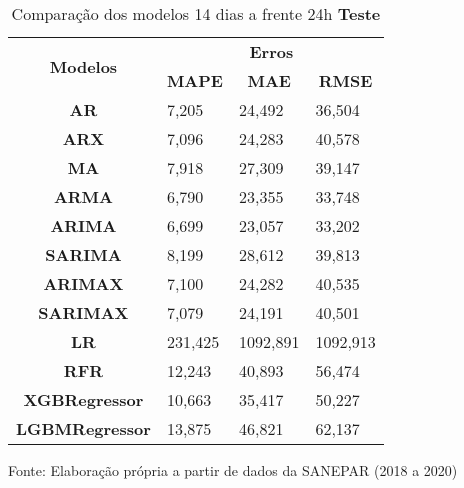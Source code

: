 \begin{table}[H]
	\centering
	\caption{Comparação dos modelos 14 dias a frente 24h \textbf{Teste} }\label{tb:30-24tst}
	\begin{tabular}{@{}clll@{}}
		\toprule
		\multirow{2}{*}{\textbf{Modelos}} & \multicolumn{3}{c}{\textbf{Erros}}                                                                       \\ \cmidrule(l){2-4} 
		& \multicolumn{1}{c}{\textbf{MAPE}} & \multicolumn{1}{c}{\textbf{MAE}} & \multicolumn{1}{c}{\textbf{RMSE}} \\ \hline
\textbf{AR}                       & 7,205                             & 24,492                           & 36,504                            \\
\textbf{ARX}                      & 7,096                             & 24,283                           & 40,578                            \\
\textbf{MA}                       & 7,918                             & 27,309                           & 39,147                            \\
\textbf{ARMA}                     & 6,790                             & 23,355                           & 33,748                            \\
\textbf{ARIMA}                    & 6,699                             & 23,057                           & 33,202                            \\
\textbf{SARIMA}                   & 8,199                             & 28,612                           & 39,813                            \\
\textbf{ARIMAX}                   & 7,100                             & 24,282                           & 40,535                            \\
\textbf{SARIMAX}                  & 7,079                             & 24,191                           & 40,501                            \\
\textbf{LR}        & 231,425                           & 1092,891                         & 1092,913                          \\
\textbf{RFR}  & 12,243                            & 40,893                           & 56,474                            \\
\textbf{XGBRegressor}             & 10,663                            & 35,417                           & 50,227                            \\
\textbf{LGBMRegressor}            & 13,875                            & 46,821                           & 62,137                            \\ \bottomrule
	\end{tabular}

Fonte: Elaboração própria a partir de dados da SANEPAR (2018 a 2020)
\end{table}

